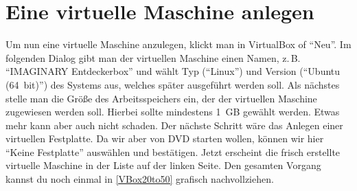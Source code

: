 \documentclass[a4paper,10pt,BCOR=0mm,DIV=14]{scrartcl}
\newcommand{\command}[1]{\textsf{\enquote{#1}}}
\begin{document}
\section{Eine virtuelle Maschine anlegen}
Um nun eine virtuelle Maschine anzulegen, klickt man in VirtualBox of \command{Neu}. Im folgenden Dialog gibt man der virtuellen Maschine einen Namen, z.\,B. \command{IMAGINARY Entdeckerbox} und wählt Typ (\command{Linux}) und Version (\command{Ubuntu (64\, bit)}) des Systems aus, welches später ausgeführt werden soll. Als nächstes stelle man die Größe des Arbeitsspeichers ein, der der virtuellen Maschine zugewiesen werden soll. Hierbei sollte mindestens 1\, GB gewählt werden. Etwas mehr kann aber auch nicht schaden. Der nächste Schritt wäre das Anlegen einer virtuellen Festplatte. Da wir aber von DVD starten wollen, können wir hier \command{Keine Festplatte} auswählen und bestätigen. Jetzt erscheint die frisch erstellte virtuelle Maschine in der Liste auf der linken Seite. Den gesamten Vorgang kannst du noch einmal in \cref{VBox20to50} grafisch nachvollziehen.
\end{document}
